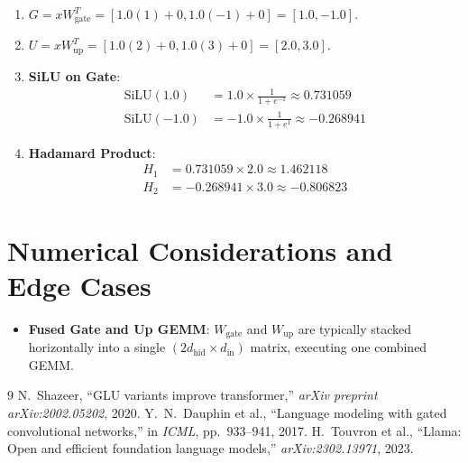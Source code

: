 \documentclass[11pt,a4paper]{article}
\theoremstyle{definition}
\begin{document}
\begin{enumerate}
    \item $G = x W_{\text{gate}}^T = [1.0(1) + 0, 1.0(-1) + 0] = [1.0, -1.0]$.
    \item $U = x W_{\text{up}}^T = [1.0(2) + 0, 1.0(3) + 0] = [2.0, 3.0]$.
    \item \textbf{SiLU on Gate}:
    \begin{align}
    \text{SiLU}(1.0) &= 1.0 \times \frac{1}{1 + e^{-1}} \approx 0.731059 \\
    \text{SiLU}(-1.0) &= -1.0 \times \frac{1}{1 + e^1} \approx -0.268941
    \end{align}
    \item \textbf{Hadamard Product}:
    \begin{align}
    H_1 &= 0.731059 \times 2.0 \approx 1.462118 \\
    H_2 &= -0.268941 \times 3.0 \approx -0.806823
    \end{align}
\end{enumerate}

\section{Numerical Considerations and Edge Cases}

\begin{itemize}
    \item \textbf{Fused Gate and Up GEMM}: $W_{\text{gate}}$ and $W_{\text{up}}$ are typically stacked horizontally into a single $(2 d_{\text{hid}} \times d_{\text{in}})$ matrix, executing one combined GEMM.
\end{itemize}

\begin{thebibliography}{9}
 N.~Shazeer, ``GLU variants improve transformer,'' \emph{arXiv preprint arXiv:2002.05202}, 2020.
 Y.~N.~Dauphin et al., ``Language modeling with gated convolutional networks,'' in \emph{ICML}, pp.~933--941, 2017.
 H.~Touvron et al., ``Llama: Open and efficient foundation language models,'' \emph{arXiv:2302.13971}, 2023.
\end{thebibliography}
\end{document}
